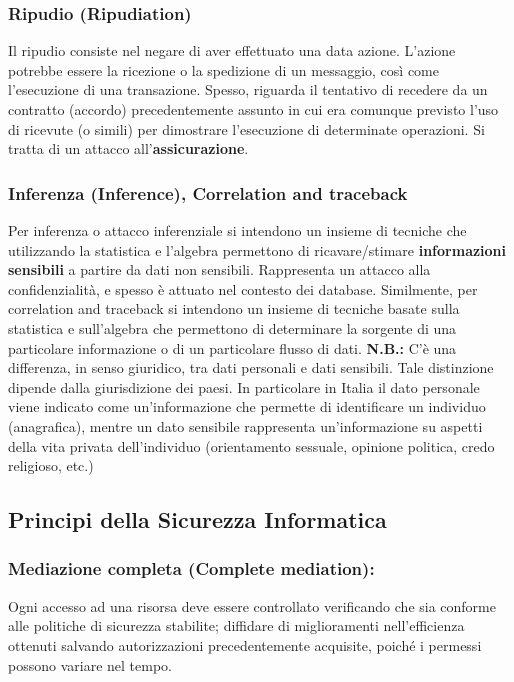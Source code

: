 \subsubsection{Ripudio (Ripudiation)}
Il ripudio consiste nel negare di aver effettuato una data azione. L'azione potrebbe essere la ricezione o la spedizione di un messaggio, così come l'esecuzione di una transazione. Spesso, riguarda il tentativo di recedere da un contratto (accordo) precedentemente assunto in cui era comunque previsto l'uso di ricevute (o simili) per dimostrare l'esecuzione di determinate operazioni. Si tratta di un attacco all'\textbf{assicurazione}.

\subsubsection{Inferenza (Inference), Correlation and traceback}
Per inferenza o attacco inferenziale si intendono un insieme di tecniche che utilizzando la statistica e l'algebra permettono di ricavare/stimare \textbf{informazioni sensibili} a partire da dati non sensibili. Rappresenta un attacco alla confidenzialità, e spesso è attuato nel contesto dei database. Similmente, per correlation and traceback si intendono un insieme di tecniche basate sulla statistica e sull’algebra che permettono di determinare la sorgente di una particolare informazione o di un particolare flusso di dati.\newline \newline
\textbf{N.B.:} C'è una differenza, in senso giuridico, tra dati personali e dati sensibili. Tale distinzione dipende dalla giurisdizione dei paesi. In particolare in Italia il dato personale viene indicato come un'informazione che permette di identificare un individuo (anagrafica), mentre un dato sensibile rappresenta un'informazione su aspetti della vita privata dell'individuo (orientamento sessuale, opinione politica, credo religioso, etc.)

\subsection{Principi della Sicurezza Informatica}

\subsubsection{Mediazione completa (Complete mediation):} Ogni accesso ad una risorsa deve essere controllato verificando che sia conforme alle politiche di sicurezza stabilite; diffidare di miglioramenti nell’efficienza ottenuti salvando autorizzazioni precedentemente acquisite, poiché i permessi possono variare nel tempo.

